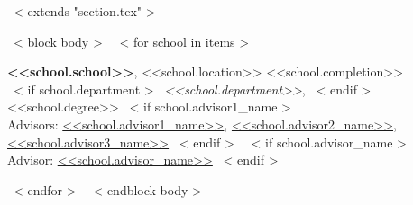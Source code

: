 ~< extends "section.tex" >~

~< block body >~
~< for school in items >~

  {\bf <<school.school>>}, <<school.location>> \hfill <<school.completion>> \\
  ~< if school.department >~ {\em <<school.department>>}, ~< endif >~ <<school.degree>>
  ~< if school.advisor1_name >~
    \\
    Advisors: \href{<<school.advisor1_url>>}{\color{links}<<school.advisor1_name>>}, \href{<<school.advisor2_url>>}{\color{links}<<school.advisor2_name>>}, \href{<<school.advisor3_url>>}{\color{links}<<school.advisor3_name>>}
  ~< endif >~
  ~< if school.advisor_name >~
    \\
    Advisor: \href{<<school.advisor_website>>}{\color{links}<<school.advisor_name>>}
  ~< endif >~

~< endfor >~
~< endblock body >~
